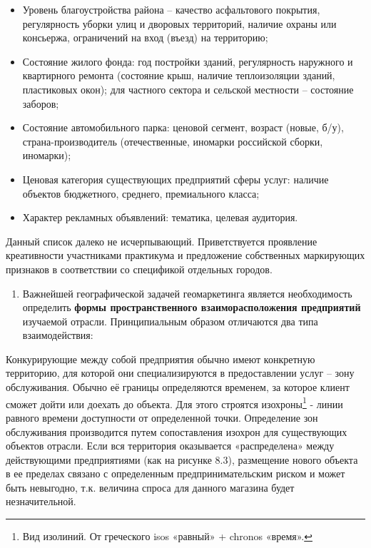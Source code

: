 \documentclass[
  11pt,
]{book}
\providecommand{\tightlist}{%
  \setlength{\itemsep}{0pt}\setlength{\parskip}{0pt}}
\begin{document}
\begin{itemize}
\tightlist
\item
  Уровень благоустройства района -- качество асфальтового покрытия, регулярность уборки улиц и дворовых территорий, наличие охраны или консьержа, ограничений на вход (въезд) на территорию;
\item
  Состояние жилого фонда: год постройки зданий, регулярность наружного и квартирного ремонта (состояние крыш, наличие теплоизоляции зданий, пластиковых окон); для частного сектора и сельской местности -- состояние заборов;
\item
  Состояние автомобильного парка: ценовой сегмент, возраст (новые, б/у), страна-производитель (отечественные, иномарки российской сборки, иномарки);
\item
  Ценовая категория существующих предприятий сферы услуг: наличие объектов бюджетного,
  среднего, премиального класса;
\item
  Характер рекламных объявлений: тематика, целевая аудитория.
\end{itemize}

Данный список далеко не исчерпывающий.
Приветствуется проявление креативности участниками практикума и предложение
собственных маркирующих признаков в соответствии со спецификой отдельных
городов.

\begin{enumerate}
\def\labelenumi{\arabic{enumi}.}
\setcounter{enumi}{2}
\tightlist
\item
  Важнейшей географической задачей геомаркетинга является необходимость определить \textbf{формы пространственного взаиморасположения предприятий} изучаемой отрасли. Принципиальным образом отличаются два типа взаимодействия:
\end{enumerate}

Конкурирующие между собой предприятия обычно имеют конкретную территорию, для которой они специализируются в
предоставлении услуг -- зону обслуживания. Обычно её границы определяются временем, за которое клиент сможет дойти или доехать до объекта. Для этого строятся изохроны\footnote{Вид изолиний. От греческого isos «равный» + chronos «время».} - линии равного времени доступности от определенной точки. Определение зон
обслуживания производится путем сопоставления изохрон для существующих объектов отрасли. Если вся территория оказывается «распределена» между действующими предприятиями (как на рисунке 8.3), размещение нового объекта в ее
пределах связано с определенным предпринимательским риском и может быть
невыгодно, т.к. величина спроса для данного магазина будет незначительной.
\end{document}
